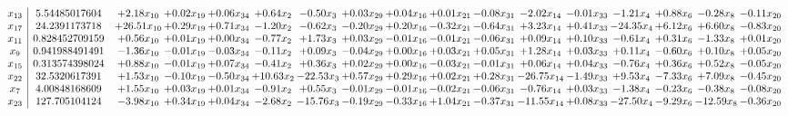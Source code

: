 \documentclass[9pt]{article}
\begin{document}
 \[\begin{array}{c| c c@{\hskip 2pt} c@{\hskip 2pt} c@{\hskip 2pt} c@{\hskip 2pt} c@{\hskip 2pt} c@{\hskip 2pt} c@{\hskip 2pt} c@{\hskip 2pt} c@{\hskip 2pt} c@{\hskip 2pt} c@{\hskip 2pt} c@{\hskip 2pt} c@{\hskip 2pt} c@{\hskip 2pt} c@{\hskip 2pt} }
 x_{13}   &  5.54485017604 & +  2.18 x_{10} & +  0.02 x_{19} & +  0.06 x_{34} & +  0.64 x_{2} & -0.50 x_{3} & +  0.03 x_{29} & +  0.04 x_{16} & +  0.01 x_{21} & -0.08 x_{31} & -2.02 x_{14} & -0.01 x_{33} & -1.21 x_{4} & +  0.88 x_{6} & -0.28 x_{8} & -0.11 x_{20}\\
 x_{17}   &  24.2391173718 & + 26.51 x_{10} & +  0.29 x_{19} & +  0.71 x_{34} & -1.20 x_{2} & -0.62 x_{3} & -0.20 x_{29} & +  0.20 x_{16} & -0.32 x_{21} & -0.64 x_{31} & +  3.23 x_{14} & +  0.41 x_{33} & -24.35 x_{4} & +  6.12 x_{6} & +  6.60 x_{8} & -0.83 x_{20}\\
 x_{11}   &  0.828452709159 & +  0.56 x_{10} & +  0.01 x_{19} & +  0.00 x_{34} & -0.77 x_{2} & +  1.73 x_{3} & +  0.03 x_{29} & -0.01 x_{16} & -0.01 x_{21} & -0.06 x_{31} & +  0.09 x_{14} & +  0.10 x_{33} & -0.61 x_{4} & +  0.31 x_{6} & -1.33 x_{8} & +  0.01 x_{20}\\
 x_{9}   &  0.941988491491 & -1.36 x_{10} & -0.01 x_{19} & -0.03 x_{34} & -0.11 x_{2} & +  0.09 x_{3} & -0.04 x_{29} & +  0.00 x_{16} & +  0.03 x_{21} & +  0.05 x_{31} & +  1.28 x_{14} & +  0.03 x_{33} & +  0.11 x_{4} & -0.60 x_{6} & +  0.10 x_{8} & +  0.05 x_{20}\\
 x_{15}   &  0.313574398024 & +  0.88 x_{10} & -0.01 x_{19} & +  0.07 x_{34} & -0.41 x_{2} & +  0.36 x_{3} & +  0.02 x_{29} & +  0.00 x_{16} & -0.03 x_{21} & -0.01 x_{31} & +  0.06 x_{14} & +  0.04 x_{33} & -0.76 x_{4} & +  0.36 x_{6} & +  0.52 x_{8} & -0.05 x_{20}\\
 x_{22}   &  32.5320617391 & +  1.53 x_{10} & -0.10 x_{19} & -0.50 x_{34} & + 10.63 x_{2} & -22.53 x_{3} & +  0.57 x_{29} & +  0.29 x_{16} & +  0.02 x_{21} & +  0.28 x_{31} & -26.75 x_{14} & -1.49 x_{33} & +  9.53 x_{4} & -7.33 x_{6} & +  7.09 x_{8} & -0.45 x_{20}\\
 x_{7}   &  4.00848168609 & +  1.55 x_{10} & +  0.03 x_{19} & +  0.01 x_{34} & -0.91 x_{2} & +  0.55 x_{3} & -0.01 x_{29} & -0.01 x_{16} & -0.02 x_{21} & -0.06 x_{31} & -0.76 x_{14} & +  0.03 x_{33} & -1.38 x_{4} & -0.23 x_{6} & -0.38 x_{8} & -0.08 x_{20}\\
 x_{23}   &  127.705104124 & -3.98 x_{10} & +  0.34 x_{19} & +  0.04 x_{34} & -2.68 x_{2} & -15.76 x_{3} & -0.19 x_{29} & -0.33 x_{16} & +  1.04 x_{21} & -0.37 x_{31} & -11.55 x_{14} & +  0.08 x_{33} & -27.50 x_{4} & -9.29 x_{6} & -12.59 x_{8} & -0.36 x_{20}\\

\end{array}\]
\end{document}
